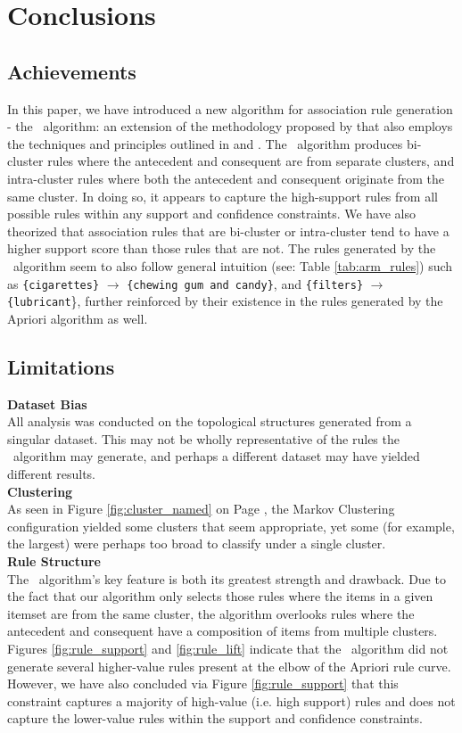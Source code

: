 \chapter{Conclusions}
\section{Achievements}
In this paper, we have introduced a new algorithm for association rule generation - the \algo\ algorithm: an extension of the methodology proposed by  that also employs the techniques and principles outlined in  and . The \algo\ algorithm produces bi-cluster rules where the antecedent and consequent are from separate clusters, and intra-cluster rules where both the antecedent and consequent originate from the same cluster. In doing so, it appears to capture the high-support rules from all possible rules within any support and confidence constraints.  We have also theorized that association rules that are bi-cluster or intra-cluster tend to have a higher support score than those rules that are not. The rules generated by the \algo\ algorithm seem to also follow general intuition (see: Table \ref{tab:arm_rules}) such as \texttt{\{cigarettes\}} $\rightarrow$ \texttt{\{chewing gum and candy\}}, and \texttt{\{filters\}} $\rightarrow$ \texttt{\{lubricant}\}, further reinforced by their existence in the rules generated by the Apriori algorithm as well.

\section{Limitations}
\textbf{Dataset Bias}\\
All analysis was conducted on the topological structures generated from a singular dataset. This may not be wholly representative of the rules the \algo\ algorithm may generate, and perhaps a different dataset may have yielded different results.
\\\textbf{Clustering}\\
As seen in Figure \ref{fig:cluster_named} on Page \pageref{fig:cluster_named}, the Markov Clustering configuration yielded some clusters that seem appropriate, yet some (for example, the largest) were perhaps too broad to classify under a single cluster.
\\\textbf{Rule Structure}\\
The \algo\ algorithm's key feature is both its greatest strength and drawback. Due to the fact that our algorithm only selects those rules where the items in a given itemset are from the same cluster, the algorithm overlooks rules where the antecedent and consequent have a composition of items from multiple clusters. 
Figures \ref{fig:rule_support} and \ref{fig:rule_lift} indicate that the \algo\ algorithm did not generate several higher-value rules present at the elbow of the Apriori rule curve.
However, we have also concluded via Figure \ref{fig:rule_support} that this constraint captures a majority of high-value (i.e. high support) rules and does not capture the lower-value rules within the support and confidence constraints.


